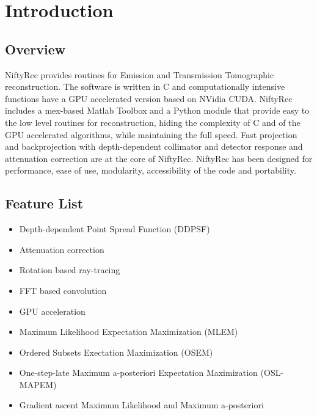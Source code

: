 \documentclass[12pt,a4paper]{report}
\begin{document}

\tableofcontents


\chapter{Introduction}

\section{Overview}

NiftyRec provides routines for Emission and Transmission Tomographic reconstruction. 
The software is written in C and computationally intensive functions have a 
GPU accelerated version based on NVidia CUDA.
NiftyRec includes a mex-based Matlab Toolbox and a Python module that 
provide easy to the low level routines for reconstruction, hiding the complexity of C and 
of the GPU accelerated algorithms, while maintaining the full speed. 
Fast projection and backprojection with depth-dependent collimator and detector response and 
attenuation correction are at the core of NiftyRec. 
NiftyRec has been designed for performance, ease of use, modularity, accessibility of the code and portability.


\section{Feature List}

\begin{itemize}
  \item Depth-dependent Point Spread Function (DDPSF)
  \item Attenuation correction
  \item Rotation based ray-tracing
  \item FFT based convolution
  \item GPU acceleration
\end{itemize}

\begin{itemize}
  \item Maximum Likelihood Expectation Maximization (MLEM)
  \item Ordered Subsets Exectation Maximization (OSEM)
  \item One-step-late Maximum a-posteriori Expectation Maximization (OSL-MAPEM)
  \item Gradient ascent Maximum Likelihood and Maximum a-posteriori
\end{itemize}
\end{document}
